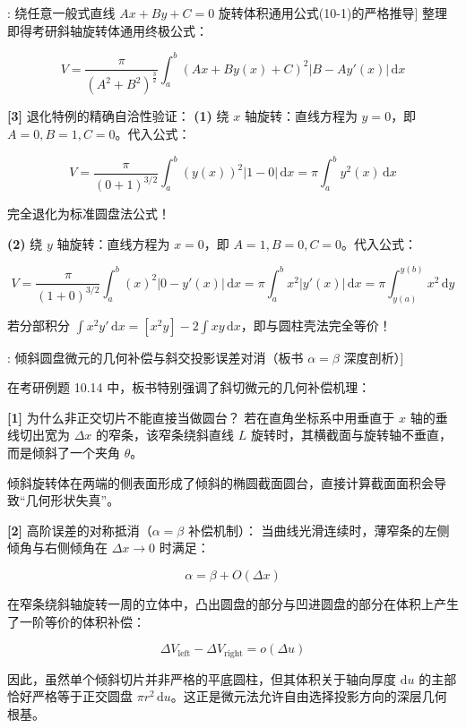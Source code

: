 \documentclass[11pt,a4paper,UTF8]{ctexart}
\begin{document}
\begin{thmbox}[模型[1]: 绕任意一般式直线 $Ax+By+C=0$ 旋转体积通用公式(10-1)的严格推导]
整理即得考研斜轴旋转体通用终极公式：


\begin{equation*}
V = \frac{\pi}{(A^2+B^2)^{\frac{3}{2}}} \int_a^b (Ax + By(x) + C)^2 |B - A y'(x)|\,\mathrm{d}x
\end{equation*}


\textbf{[3]} 退化特例的精确自洽性验证：
\textbf{(1)}  \textit{}绕 $x$ 轴旋转\textit{}：直线方程为 $y = 0$，即 $A = 0, B = 1, C = 0$。代入公式：


\begin{equation*}
V = \frac{\pi}{(0+1)^{3/2}} \int_a^b (y(x))^2 |1 - 0|\,\mathrm{d}x = \pi \int_a^b y^2(x)\,\mathrm{d}x
\end{equation*}


完全退化为标准圆盘法公式！

\textbf{(2)}  \textit{}绕 $y$ 轴旋转\textit{}：直线方程为 $x = 0$，即 $A = 1, B = 0, C = 0$。代入公式：


\begin{equation*}
V = \frac{\pi}{(1+0)^{3/2}} \int_a^b (x)^2 |0 - y'(x)|\,\mathrm{d}x = \pi \int_a^b x^2 |y'(x)|\,\mathrm{d}x = \pi \int_{y(a)}^{y(b)} x^2\,\mathrm{d}y
\end{equation*}


若分部积分 $\int x^2 y'\,\mathrm{d}x = [x^2 y] - 2\int x y\,\mathrm{d}x$，即与圆柱壳法完全等价！

\end{thmbox}
\begin{thmbox}[模型[2]: 倾斜圆盘微元的几何补偿与斜交投影误差对消（板书 $\alpha = \beta$ 深度剖析）]

在考研例题 10.14 中，板书特别强调了斜切微元的几何补偿机理：

\textbf{[1]} 为什么非正交切片不能直接当做圆台？
若在直角坐标系中用垂直于 $x$ 轴的垂线切出宽为 $\Delta x$ 的窄条，该窄条绕斜直线 $L$ 旋转时，其横截面与旋转轴不垂直，而是倾斜了一个夹角 $\theta$。

倾斜旋转体在两端的侧表面形成了倾斜的椭圆截面圆台，直接计算截面面积会导致“几何形状失真”。

\textbf{[2]} 高阶误差的对称抵消（$\alpha = \beta$ 补偿机制）：
当曲线光滑连续时，薄窄条的左侧倾角与右侧倾角在 $\Delta x \to 0$ 时满足：


\begin{equation*}
\alpha = \beta + O(\Delta x)
\end{equation*}


在窄条绕斜轴旋转一周的立体中，凸出圆盘的部分与凹进圆盘的部分在体积上产生了一阶等价的体积补偿：


\begin{equation*}
\Delta V_{\text{left}} - \Delta V_{\text{right}} = o(\Delta u)
\end{equation*}


因此，虽然单个倾斜切片并非严格的平底圆柱，但其体积关于轴向厚度 $\mathrm{d}u$ 的主部恰好严格等于正交圆盘 $\pi r^2\,\mathrm{d}u$。这正是微元法允许自由选择投影方向的深层几何根基。

\end{thmbox}
\end{document}
